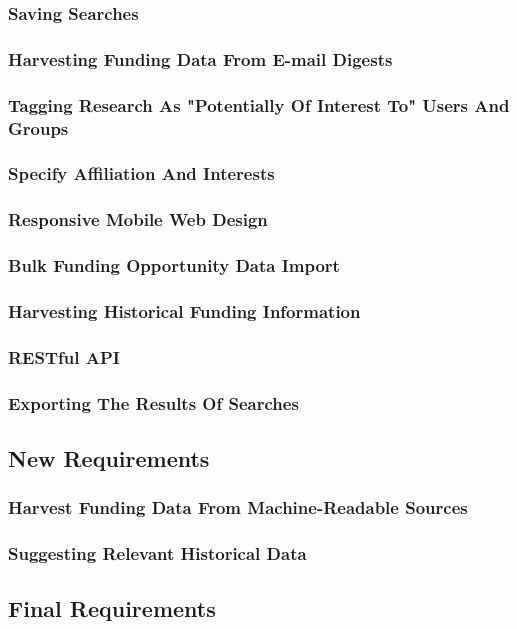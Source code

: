 \subsubsection{Saving Searches}
\subsubsection{Harvesting Funding Data From E-mail Digests}
\subsubsection{Tagging Research As "Potentially Of Interest To" Users And Groups}
\subsubsection{Specify Affiliation And Interests}
\subsubsection{Responsive Mobile Web Design}
\subsubsection{Bulk Funding Opportunity Data Import}
\subsubsection{Harvesting Historical Funding Information}
\subsubsection{RESTful API}
\subsubsection{Exporting The Results Of Searches}
\subsection{New Requirements}
\subsubsection{Harvest Funding Data From Machine-Readable Sources}
\subsubsection{Suggesting Relevant Historical Data}
\subsection{Final Requirements}
